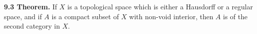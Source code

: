 \textbf{9.3 Theorem.} If $X$ is a topological space which is either a Hausdorff or a regular space, and if $A$ is a compact subset of $X$ with non-void interior, then $A$ is of the second category in $X$.

